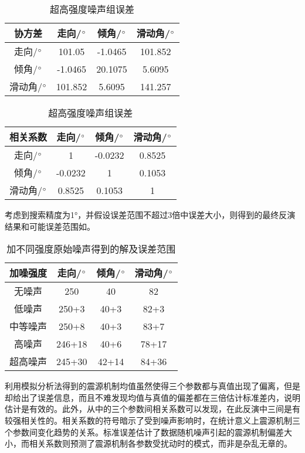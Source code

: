 \begin{table}[ht]
\centering
\caption{超高强度噪声组误差}
\label{tab3_04}
    \begin{tabular}{c c c c}
    \hline
    协方差 & 走向/$^\circ$ & 倾角/$^\circ$ & 滑动角/$^\circ$ \\
    \hline
	走向/$^\circ$ 		&101.05 	&-1.0465	&101.852\\
	倾角/$^\circ$		&-1.0465	&20.1075	&5.6095\\
	滑动角/$^\circ$	&101.852	&5.6095		&141.257\\
    \hline
    \end{tabular}
    \begin{tabular}{c c c c}
    \hline
    相关系数 & 走向/$^\circ$ & 倾角/$^\circ$ & 滑动角/$^\circ$ \\
    \hline
	走向/$^\circ$ 		&1 			&-0.0232	&0.8525\\
	倾角/$^\circ$		&-0.0232	&1			&0.1053\\
	滑动角/$^\circ$	&0.8525		&0.1053		&1\\
    \hline
    \end{tabular}
\end{table}
考虑到搜索精度为1°，并假设误差范围不超过3倍中误差大小，则得到的最终反演结果和可能误差范围如。
\begin{table}[ht]
\centering
\caption{加不同强度原始噪声得到的解及误差范围}
\label{tab3_05}
    \begin{tabular}{c c c c}
    \hline
    加噪强度 & 走向/$^\circ$ & 倾角/$^\circ$ & 滑动角/$^\circ$ \\
    \hline
    无噪声		& 250 & 40 & 82  \\
    低噪声		& 250+3 & 40+3 & 82+3  \\
    中等噪声	& 250+8 & 40+3 & 83+7  \\
    高噪声		& 246+18 & 40+6 & 78+17  \\
    超高噪声	& 245+30 & 42+14 & 84+36  \\
    \hline
    \end{tabular}
\end{table}

利用模拟分析法得到的震源机制均值虽然使得三个参数都与真值出现了偏离，但是却给出了误差信息，而且不难发现均值与真值的偏差都在三倍估计标准差内，说明估计是有效的。此外，从中的三个参数间相关系数可以发现，在此反演中三间是有较强相关性的。相关系数的符号暗示了受到噪声影响时，在统计意义上震源机制三个参数间变化趋势的关系。标准误差估计了数据随机噪声引起的震源机制偏差大小，而相关系数则预测了震源机制各参数受扰动时的模式，而非是杂乱无章的。

